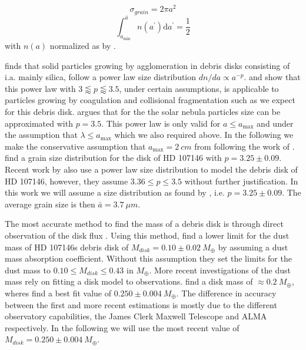 \documentclass{aa}
\begin{document}
\begin{equation}
\label{eq:eff_cross_section}
    \sigma_{grain} = 2 \pi a^2
\end{equation}
\begin{equation}
\label{eq:size_normalization}
    \int_{a_{\min }}^{\bar{a}} n\left(a^{\prime}\right) \mathrm{d} a^{\prime}=\frac{1}{2}
\end{equation}
with $n(a)$ normalized as by \cite{vanSluijs2018feasibility}.

\cite{draine2006submillimeter} finds that solid particles growing by agglomeration in debris disks consisting of i.a. mainly silica, follow a power law size distribution $d n / d a \propto a^{-p}$. \cite{dohnanyi1969collisional, tanaka1996steady} and \cite{tanaka2005dust} show that this power law with $3\lessapprox p \lessapprox 3.5$, under certain assumptions, is applicable to particles growing by coagulation and collisional fragmentation such as we expect for this debris disk. \cite{weidenschilling1997origin} argues that for the the solar nebula particles size can be approximated with $p=3.5$. This power law is only valid for 
$a \leq a_{\max }$ and under the assumption that $\lambda \leq a_{\max }$ \citep{draine2006submillimeter} which we also required above. In the following we make the conservative assumption that $a_{\max }=2~ cm$ from \cite{ricci2015alma} following the work of \cite{vanSluijs2018feasibility}.
\cite{ricci2015alma} find a grain size distribution for the disk of HD 107146 with $p=3.25 \pm 0.09$. Recent work by \cite{marino2018gap} also use a power law size distribution to model the debris disk of HD 107146, however, they assume $3.36 \leq p \leq 3.5$ without further justification. In this work we will assume a size distribution as found by \cite{ricci2015alma}, i.e. $p=3.25 \pm 0.09$.
The average grain size is then $\bar{a} = 3.7~\mu m$.

The most accurate method to find the mass of a debris disk is through direct observation of the disk flux \cite{alexander2014dispersal, wyatt2008evolution}. Using this method, \cite{williams2004detection} find a lower limit for the dust mass of HD 107146s debris disk of $M_{disk}=0.10 \pm 0.02~ M_{\oplus}$ by assuming a dust mass absorption coefficient. Without this assumption they set the limits for the dust mass to $0.10 \leq M_{disk} \leq 0.43$ in $M_{\oplus}$. More recent investigations of the dust mass rely on fitting a disk model to observations. \cite{ricci2015alma} find a disk mass of $\approx 0.2 ~M_{\oplus}$, wheres \cite{marino2018gap} find a best fit value of $0.250 \pm 0.004 ~M_{\oplus}$. The difference in accuracy between the first and more recent estimations is mostly due to the different observatory capabilities, the James Clerk Maxwell Telescope and ALMA respectively. In the following we will use the most recent value of $M_{disk}=0.250 \pm 0.004 ~M_{\oplus}$.
\end{document}
